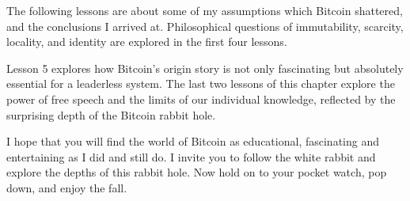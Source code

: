 The following lessons are about some of my assumptions which Bitcoin shattered,
and the conclusions I arrived at. Philosophical questions of immutability,
scarcity, locality, and identity are explored in the first four lessons.


Lesson 5 explores how Bitcoin's origin story is not only fascinating but
absolutely essential for a leaderless system. The last two lessons of this
chapter explore the power of free speech and the limits of our individual
knowledge, reflected by the surprising depth of the Bitcoin rabbit hole.

I hope that you will find the world of Bitcoin as educational, fascinating and
entertaining as I did and still do. I invite you to follow the white rabbit and
explore the depths of this rabbit hole. Now hold on to your pocket watch, pop
down, and enjoy the fall.
